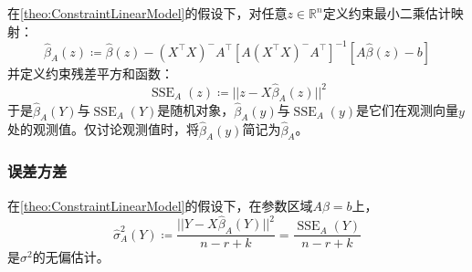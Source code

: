 \begin{definition}
	在\cref{theo:ConstraintLinearModel}的假设下，对任意$z\in\mathbb{R}^n$定义约束最小二乘估计映射：
	\begin{equation*}
		\hat{\beta}_A(z)\coloneq\hat{\beta}(z)-(X^{\top}X)^-A^{\top}[A(X^{\top}X)^-A^{\top}]^{-1}[A\hat{\beta}(z)-b]
	\end{equation*}
	并定义约束残差平方和函数：
	\begin{equation*}
		\operatorname{SSE}_A(z)\coloneq||z-X\hat{\beta}_A(z)||^2
	\end{equation*}
	于是$\hat{\beta}_A(Y)$与$\operatorname{SSE}_A(Y)$是随机对象，$\hat{\beta}_A(y)$与$\operatorname{SSE}_A(y)$是它们在观测向量$y$处的观测值。仅讨论观测值时，将$\hat{\beta}_A(y)$简记为$\hat{\beta}_A$。
\end{definition}
\subsubsection{误差方差}
\begin{theorem}
	在\cref{theo:ConstraintLinearModel}的假设下，在参数区域$A\beta=b$上，
	\begin{equation*}
		\hat{\sigma}_A^2(Y)\coloneq\frac{||Y-X\hat{\beta}_A(Y)||^2}{n-r+k}=\frac{\operatorname{SSE}_A(Y)}{n-r+k}
	\end{equation*}
	是$\sigma^2$的无偏估计。
\end{theorem}
